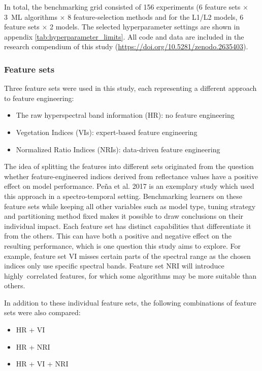 \documentclass[remotesensing,article,submit,moreauthors,pdftex]{Definitions/mdpi}
\begin{document}
In total, the benchmarking grid consisted of 156 experiments (6 feature sets $\times$ 3~ML algorithms $\times$ 8 feature-selection methods and for the L1/L2 models, 6 feature sets $\times$ 2 models.
The selected hyperparameter settings are shown in appendix \autoref{tab:hyperparameter_limits}.
All code and data are included in the research compendium of this study (\url{https://doi.org/10.5281/zenodo.2635403}).

\subsubsection{Feature sets}

Three feature sets were used in this study, each representing a different approach to feature engineering:

\begin{itemize}
	\item The raw hyperspectral band information (HR): no feature engineering %
	\item Vegetation Indices (\ac{VI}s): expert-based feature engineering
	\item Normalized Ratio Indices (\ac{NRI}s): data-driven feature engineering
\end{itemize}

The idea of splitting the features into different sets originated from the question whether feature-engineered indices derived from reflectance values have a positive effect on model performance.
Peña et al. 2017 \cite{pena2017} is an exemplary study which used this approach in a spectro-temporal setting.
Benchmarking learners on these feature sets while keeping all other variables such as model type, tuning strategy and partitioning method fixed makes it possible to draw conclusions on their individual impact.
Each feature set has distinct capabilities that differentiate it from the others.
This can have both a positive and negative effect on the resulting performance, which is one question this study aims to explore.
For example, feature set VI misses certain parts of the spectral range as the chosen indices only use specific spectral bands.
Feature set NRI will introduce highly\ correlated features, for which some algorithms may be more suitable than others.

In addition to these individual feature sets, the following combinations of feature sets were also compared:

\begin{itemize}
	\item HR + VI %
	\item HR + NRI
	\item HR + VI + NRI
\end{itemize}
\end{document}
